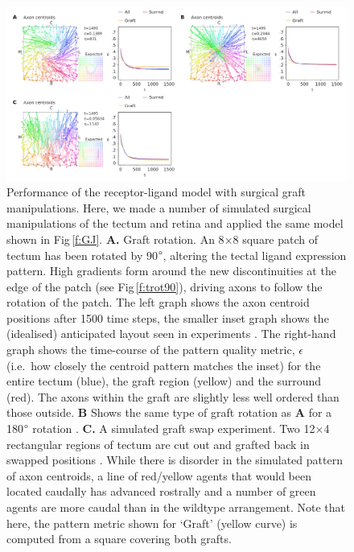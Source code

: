\documentclass[11pt, a4paper]{article}
\begin{document}
\begin{figure}
\includegraphics[width=\linewidth]{./images/fig_GJ_surgical_grafts.png}
\caption{Performance of the receptor-ligand model with surgical graft manipulations. Here, we made a number of simulated surgical manipulations of the tectum and retina and applied the same model shown in Fig\,\ref{f:GJ}. \textbf{A.} Graft rotation. An 8$\times$8 square patch of tectum has been rotated by 90$\degree$, altering the tectal ligand expression pattern. High gradients form around the new discontinuities at the edge of the patch (see Fig\,\ref{f:trot90}), driving axons to follow the rotation of the patch. The left graph shows the axon centroid positions after 1500 time steps, the smaller inset graph shows the (idealised) anticipated layout seen in experiments \citep{levine_deployment_1974}. The right-hand graph shows the time-course of the pattern quality metric, $\epsilon$ (i.e.~how closely the centroid pattern matches the inset) for the entire tectum (blue), the graft region (yellow) and the surround (red). The axons within the graft are slightly less well ordered than those outside. \textbf{B} Shows the same type of graft rotation as \textbf{A} for a 180$\degree$ rotation \citep{yoon_retention_1973}. \textbf{C.} A simulated graft swap experiment. Two 12$\times$4 rectangular regions of tectum are cut out and grafted back in swapped positions \citep{hope_arrow_1976,gaze_visuotectal_1983}. While there is disorder in the simulated pattern of axon centroids, a line of red/yellow agents that would been located caudally has advanced rostrally and a number of green agents are more caudal than in the wildtype arrangement. Note that here, the pattern metric shown for `Graft' (yellow curve) is computed from a square covering both grafts.}
\label{f:GJsurg_grafts}
\end{figure}
\end{document}
